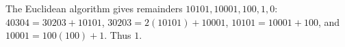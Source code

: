 The Euclidean algorithm gives remainders $10101,10001,100,1,0$: $40304=30203+10101$, $30203=2(10101)+10001$, $10101=10001+100$, and $10001=100(100)+1$. Thus $\boxed1$.
